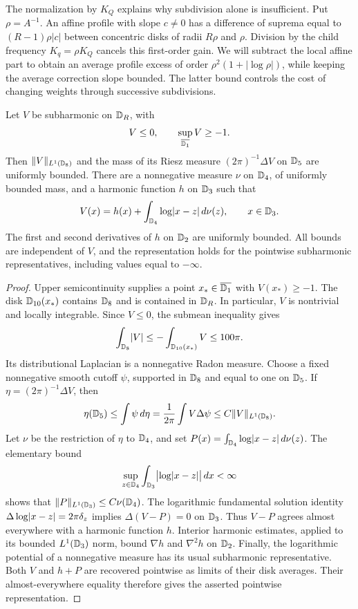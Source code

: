 The normalization by \(K_Q\) explains why subdivision alone is
insufficient.  Put \(\rho=A^{-1}\).  An affine profile with slope
\(c\ne0\) has a difference of suprema equal to
\((R-1)\rho|c|\) between concentric disks of radii \(R\rho\) and
\(\rho\).  Division by the child frequency \(K_q=\rho K_Q\)
cancels this first-order gain.  We will subtract the local affine
part to obtain an average profile excess of order
\(\rho^2(1+|\log\rho|)\), while keeping the average correction slope
bounded.  The latter bound controls the cost of changing weights
through successive subdivisions.

\begin{lemma}
\label{lem:potential-decomposition}
Let \(V\) be subharmonic on \(\mathbb D_R\), with
\[
 V\le0,
 \qquad \sup_{\overline{\mathbb D_1}}V\ge-1.
\]
Then \(\lVert V\rVert_{L^1(\mathbb D_8)}\) and the mass of its Riesz measure
\((2\pi)^{-1}\Delta V\) on \(\mathbb D_5\) are uniformly bounded.
There are a nonnegative measure \(\nu\) on \(\mathbb D_4\), of uniformly
bounded mass, and a harmonic function \(h\) on \(\mathbb D_3\) such that
\[
 V(x)=h(x)+\int_{\mathbb D_4}\log\lvert x-z\rvert\,d\nu(z),
 \qquad x\in\mathbb D_3.
\]
The first and second derivatives of \(h\) on \(\mathbb D_2\) are uniformly
bounded.  All bounds are independent of \(V\), and the representation
holds for the pointwise subharmonic representatives, including values
equal to \(-\infty\).
\end{lemma}

\begin{proof}
Upper semicontinuity supplies a point
\(x_*\in\overline{\mathbb D_1}\) with \(V(x_*)\ge-1\).  The disk
\(\mathbb D_{10}(x_*)\) contains \(\mathbb D_8\) and is contained in \(\mathbb D_R\).
In particular, \(V\) is nontrivial and locally integrable.
Since \(V\le0\), the submean inequality gives
\[
 \int_{\mathbb D_8}\lvert V\rvert
 \le -\int_{\mathbb D_{10}(x_*)}V
 \le100\pi.
\]
Its distributional Laplacian is a nonnegative Radon measure.
Choose a fixed nonnegative
smooth cutoff \(\psi\), supported in \(\mathbb D_8\) and equal to one on
\(\mathbb D_5\).  If \(\eta=(2\pi)^{-1}\Delta V\), then
\[
 \eta(\mathbb D_5)
 \le\int\psi\,d\eta
 =\frac1{2\pi}\int V\Delta\psi
 \le C\lVert V\rVert_{L^1(\mathbb D_8)}.
\]
Let \(\nu\) be the restriction of \(\eta\) to \(\mathbb D_4\), and set
\(P(x)=\int_{\mathbb D_4}\log\lvert x-z\rvert\,d\nu(z)\).
The elementary bound
\[
 \sup_{z\in\mathbb D_4}\int_{\mathbb D_3}\bigl|\log\lvert x-z\rvert\bigr|\,dx<\infty
\]
shows that \(\lVert P\rVert_{L^1(\mathbb D_3)}\le C\nu(\mathbb D_4)\).
The logarithmic fundamental solution identity
\(\Delta\log\lvert x-z\rvert=2\pi\delta_z\) implies
\(\Delta(V-P)=0\) on \(\mathbb D_3\).  Thus \(V-P\) agrees almost everywhere
with a harmonic function \(h\).  Interior harmonic estimates, applied
to its bounded \(L^1(\mathbb D_3)\) norm, bound \(\nabla h\) and \(\nabla^2h\)
on \(\mathbb D_2\).  Finally, the logarithmic potential of a nonnegative
measure has its usual subharmonic representative.  Both \(V\) and
\(h+P\) are recovered pointwise as limits of their disk averages.
Their almost-everywhere equality therefore gives the asserted
pointwise representation.
\end{proof}

